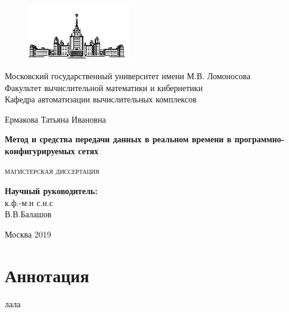 \documentclass[12pt, a4paper]{article}
\begin{document}
\sloppy
	
\begin{titlepage}
\newpage
		
\begin{figure}[t]
	\centering
	\includegraphics[width=0.4\textwidth]{img/mgu}
\end{figure}
		
\begin{center}
Московский государственный университет имени М.В. Ломоносова \\
Факультет вычислительной математики и кибернетики \\
Кафедра автоматизации вычислительных комплексов \\
\end{center}
		
\vspace{4em}
\begin{center}
\large
Ермакова Татьяна Ивановна
\end{center}
	
\begin{center}
\Large
\bfseries
Метод и средства передачи данных в реальном времени в программно-конфигурируемых сетях
\end{center}

\vspace{3em}
\begin{center}
\large
\textsc{
	магистерская диссертация
}
\end{center}

\vspace{5em}
\begin{flushright}
	\textbf{Научный руководитель:}\\
	к.ф.-м.н с.н.с\\
	В.В.Балашов\\
\end{flushright}%


\vspace{\fill}
\begin{center}
Москва 2019
\end{center}
		
\end{titlepage}

\section*{Аннотация}
лала
\end{document}
